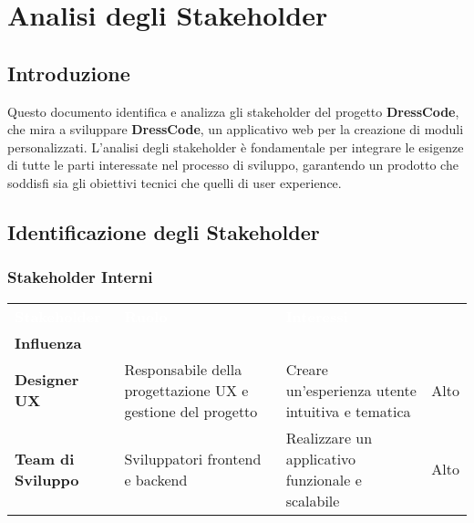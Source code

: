 \usetikzlibrary{positioning}

\section{\huge Analisi degli Stakeholder}

\subsection{Introduzione}

Questo documento identifica e analizza gli stakeholder del progetto \textbf{DressCode}, che mira a sviluppare \textbf{DressCode}, un applicativo web per la creazione di moduli personalizzati. L'analisi degli stakeholder è fondamentale per integrare le esigenze di tutte le parti interessate nel processo di sviluppo, garantendo un prodotto che soddisfi sia gli obiettivi tecnici che quelli di user experience.

\subsection{Identificazione degli Stakeholder}
\subsubsection{Stakeholder Interni}
\begin{tabularx}{\textwidth}{|>{\centering\arraybackslash}l|>{\centering\arraybackslash}X|>{\centering\arraybackslash}X|>{\centering\arraybackslash}l|}
\hline
\rowcolor{Primary}
\textcolor{white}{\textbf{Stakeholder}} & 
\textcolor{white}{\textbf{Ruolo}} & 
\textcolor{white}{\textbf{Interessi}} & 
\textcolor{white}{\makecell{\textbf{Livello di} \\ \textbf{Influenza}}} \\ \hline
\textbf{Designer UX} & Responsabile della progettazione UX e gestione del progetto & Creare un'esperienza utente intuitiva e tematica & Alto \\ \hline
\textbf{Team di Sviluppo} & Sviluppatori frontend e backend & Realizzare un applicativo funzionale e scalabile & Alto \\ \hline
\end{tabularx}

